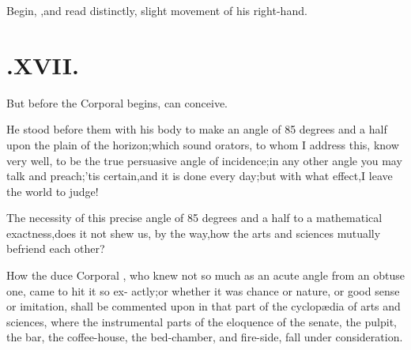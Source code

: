 \documentclass[twoside]{article}
\begin{document}
Begin, \trim,\tsh and read distinctly, 
slight movement of his right-hand.

\section{\chapstrut{}.\enspace  XVII.}

\quad\tsh But before the Corporal begins,
can conceive.

He stood before them with his body
to make an angle of 85 degrees and a half upon the
plain of the horizon;\tsh\break which sound orators, to whom I address
this, know very well, to be the true per\-suasive angle of
incidence;\tsk in any other angle you may talk and
preach;\tsk ’tis certain,\tsk and it is done every
day;\tsk\break but with what effect,\tsk I leave the world to
judge!

The necessity of this precise angle of 85 degrees and a half to
a mathematical exactness,\tsk does it not shew us, by the
way,\tsk how the arts and sciences mutually befriend each other?

How the duce Corporal \trim, who\break
knew not so much as an acute angle\break
from an obtuse one, came to hit it so ex-
actly;\tsh or whether it was chance or nature, or good
sense or imitation, \etc\break shall be commented upon in that part of
the cyclopædia of arts and sciences, where the instrumental
parts of the eloquence of the senate, the pulpit, the bar, the
coffee-house, the bed-chamber, and fire-side, fall under
consideration.
\end{document}
